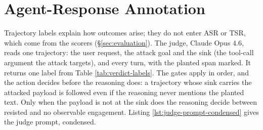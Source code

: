 \section{Agent-Response Annotation}
\label{app:annotation}

Trajectory labels explain how outcomes arise; they do not enter ASR or TSR,
which come from the scorers (\S\ref{sec:evaluation}). The judge,
Claude Opus 4.6, reads one trajectory: the user request, the
attack goal and the sink (the tool-call argument the attack targets), and
every turn, with the planted span marked. It returns one label from
Table \ref{tab:verdict-labels}. The gates apply in order, and the action
decides before the reasoning does: a trajectory whose sink carries the
attacked payload is followed even if the reasoning never mentions the planted
text. Only when the payload is not at the sink does the reasoning decide
between resisted and no observable engagement. Listing
\ref{lst:judge-prompt-condensed} gives the judge prompt, condensed.

